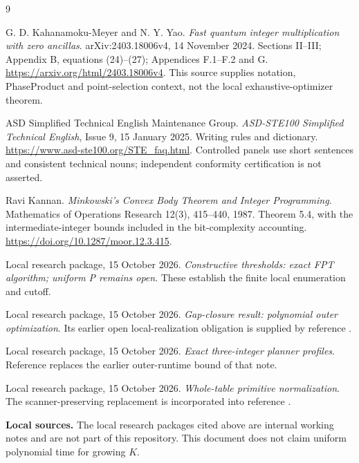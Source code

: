 \documentclass[11pt,letterpaper]{article}
\begin{document}
\clearpage
\begin{thebibliography}{9}
\raggedright
{}
G. D. Kahanamoku-Meyer and N. Y. Yao.
\emph{Fast quantum integer multiplication with zero ancillas}.
arXiv:2403.18006v4, 14 November 2024.
Sections II--III; Appendix B, equations (24)--(27);
Appendices F.1--F.2 and G.
\url{https://arxiv.org/html/2403.18006v4}.
This source supplies notation, PhaseProduct and point-selection
context, not the local exhaustive-optimizer theorem.

ASD Simplified Technical English Maintenance Group.
\emph{ASD-STE100 Simplified Technical English}, Issue 9,
15 January 2025. Writing rules and dictionary.
\url{https://www.asd-ste100.org/STE_faq.html}.
Controlled panels use short sentences and consistent technical nouns;
independent conformity certification is not asserted.

Ravi Kannan.
\emph{Minkowski's Convex Body Theorem and Integer Programming}.
Mathematics of Operations Research 12(3), 415--440, 1987.
Theorem 5.4, with the intermediate-integer bounds included in
the bit-complexity accounting.
\url{https://doi.org/10.1287/moor.12.3.415}.

Local research package, 15 October 2026.
\emph{Constructive thresholds: exact FPT algorithm; uniform P remains open}.
These establish the finite local enumeration and cutoff.

Local research package, 15 October 2026.
\emph{Gap-closure result: polynomial outer optimization}.
Its earlier open local-realization obligation is supplied by
reference \cite{threshold}.

Local research package, 15 October 2026.
\emph{Exact three-integer planner profiles}.
Reference \cite{outer} replaces the earlier
outer-runtime bound of that note.

Local research package, 15 October 2026.
\emph{Whole-table primitive normalization}.
The scanner-preserving replacement is incorporated into
reference \cite{threshold}.
\end{thebibliography}

\small
\textbf{Local sources.}
The local research packages cited above are internal working notes and are not
part of this repository.
This document does not claim uniform polynomial time for growing \(K\).
\end{document}
